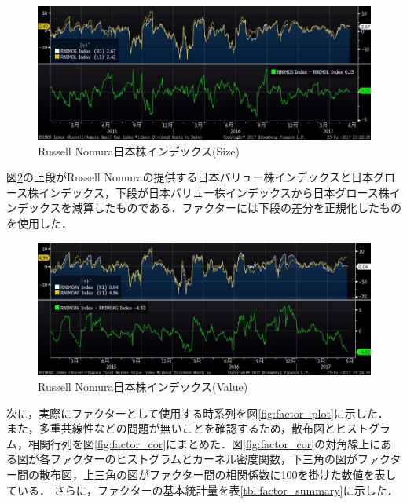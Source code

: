 ﻿\documentclass[a4paper]{jarticle}
\begin{document}
\begin{figure}[H]
	\begin{center}
		\includegraphics[width=15cm]{./fig/Size.jpg}
		\caption{Russell Nomura日本株インデックス(Size)}
		\label{fig:Size}
	\end{center}
\end{figure}
図\ref{fig:Value}の上段がRussell Nomuraの提供する日本バリュー株インデックスと日本グロース株インデックス，下段が日本バリュー株インデックスから日本グロース株インデックスを減算したものである．ファクターには下段の差分を正規化したものを使用した．
\begin{figure}[H]
	\begin{center}
		\includegraphics[width=15cm]{./fig/Value.jpg}
		\caption{Russell Nomura日本株インデックス(Value)}
		\label{fig:Value}
	\end{center}
\end{figure}

次に，実際にファクターとして使用する時系列を図\ref{fig:factor_plot}に示した．
また，多重共線性などの問題が無いことを確認するため，散布図とヒストグラム，相関行列を図\ref{fig:factor_cor}にまとめた．図\ref{fig:factor_cor}の対角線上にある図が各ファクターのヒストグラムとカーネル密度関数，下三角の図がファクター間の散布図，上三角の図がファクター間の相関係数に100を掛けた数値を表している．
さらに，ファクターの基本統計量を表\ref{tbl:factor_summary}に示した．
\end{document}
